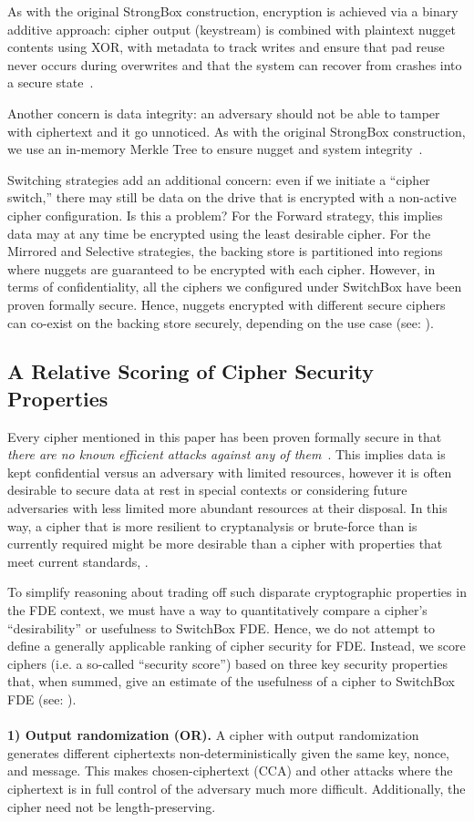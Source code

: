 As with the original StrongBox construction, encryption is achieved via a binary
additive approach: cipher output (keystream) is combined with plaintext nugget
contents using XOR, with metadata to track writes and ensure that pad reuse
never occurs during overwrites and that the system can recover from crashes into
a secure state~\cite{StrongBox}.

Another concern is data integrity: an adversary should not be able to tamper
with ciphertext and it go unnoticed. As with the original StrongBox
construction, we use an in-memory Merkle Tree to ensure nugget and system
integrity~\cite{StrongBox}.

Switching strategies add an additional concern: even if we initiate a ``cipher
switch,'' there may still be data on the drive that is encrypted with a
non-active cipher configuration. Is this a problem? For the Forward strategy,
this implies data may at any time be encrypted using the least desirable cipher.
For the Mirrored and Selective strategies, the backing store is partitioned into
regions where nuggets are guaranteed to be encrypted with each cipher. However,
in terms of confidentiality, all the ciphers we configured under SwitchBox have
been proven formally secure. Hence, nuggets encrypted with different secure
ciphers can co-exist on the backing store securely, depending on the use case
(see: ).

\subsection{A Relative Scoring of Cipher Security Properties}

Every cipher mentioned in this paper has been proven formally secure in that
\emph{there are no known efficient attacks against any of them}~\cite{All,
Ciphers, Again}. This implies data is kept confidential versus an adversary with
limited resources, however it is often desirable to secure data at rest in
special contexts or considering future adversaries with less limited more
abundant resources at their disposal. In this way, a cipher that is more
resilient to cryptanalysis or brute-force than is currently required might be
more desirable than a cipher with properties that meet current standards,
.

To simplify reasoning about trading off such disparate cryptographic properties
in the FDE context, we must have a way to quantitatively compare a cipher's
``desirability'' or usefulness to SwitchBox FDE. Hence, we do not attempt to
define a generally applicable ranking of cipher security for FDE. Instead, we
score ciphers (i.e. a so-called ``security score'') based on three key security
properties that, when summed, give an estimate of the usefulness of a cipher to
SwitchBox FDE (see: ).\\
\\
\textbf{1) Output randomization (OR).} A cipher with output randomization
generates different ciphertexts non-deterministically given the same key, nonce,
and message. This makes chosen-ciphertext (CCA) and other attacks where the
ciphertext is in full control of the adversary much more difficult.
Additionally, the cipher need not be length-preserving.

